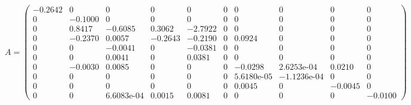 \begin{equation}  \label{eq:A_full}
	A =
	\left(\begin{array}{cccccccccc}
		-0.2642 & 0 & 0 & 0 & 0 & 0 & 0 & 0 & 0 & 0\\
		0 & -0.1000 & 0 & 0 & 0 & 0 & 0 & 0 & 0 & 0\\
		0 & 0.8417 & -0.6085 & 0.3062 & -2.7922 & 0 & 0 & 0 & 0 & 0\\
		0 & -0.2370 & 0.0057 & -0.2643 & -0.2190 & 0 & 0.0924 & 0 & 0 & 0\\
		0 & 0 & -0.0041 & 0 & -0.0381 & 0 & 0 & 0 & 0 & 0\\
		0 & 0 & 0.0041 & 0 & 0.0381 & 0 & 0 & 0 & 0 & 0\\
		0 & -0.0030 & 0.0085 & 0 & 0 & 0 & -0.0298 & \text{2.6253e-04} & 0.0210 & 0\\
		0 & 0 & 0 & 0 & 0 & 0 & \text{5.6180e-05} & -\text{1.1236e-04} & 0 & 0\\
		0 & 0 & 0 & 0 & 0 & 0 & 0.0045 & 0 & -0.0045 & 0\\
		0 & 0 & \text{6.6083e-04} & 0.0015 & 0.0081 & 0 & 0 & 0 & 0 & -0.0100
	\end{array}\right)
\end{equation}


